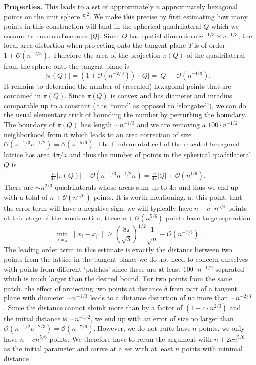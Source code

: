 \documentclass[10pt, reqno]{amsart}
\begin{document}
\textbf{Properties.} This leads to a set of approximately $n$ approximately hexagonal points on the unit sphere $\mathbb{S}^2$.  We make this precise by first estimating how many points in this construction will land in the spherical quadrilateral $Q$ which we assume to have surface area $|Q|$. Since $Q$ has spatial dimensions $n^{-1/3} \times n^{-1/3}$, the local area distortion when projecting onto the tangent plane $T$ is of order $1 + \mathcal{O}(n^{-2/3})$. Therefore the area of the projection $\pi(Q)$ of the quadrilateral from the sphere onto the tangent plane is 
$$ |\pi(Q)| = (1+ \mathcal{O}(n^{-2/3})) \cdot |Q| = |Q| + \mathcal{O}(n^{-4/3}).$$
It remains to determine the number of (rescaled) hexagonal points that are contained in $\pi(Q)$.  Since $\pi(Q)$ is convex and has diameter and inradius comparable up to a constant (it is `round' as opposed to `elongated'), we can do the usual elementary trick of bounding the number by perturbing the boundary. The boundary of $\pi(Q)$ has length $\sim n^{-1/3}$ and we are removing a $100\cdot n^{-1/2}$ neighborhood from it which leads to an area correction of size $\mathcal{O}(n^{-1/3} n^{-1/2}) = \mathcal{O}(n^{-5/6})$. 
The fundamental cell of the rescaled hexagonal lattice has area $4\pi/n$ and thus the number of points in the spherical quadrilateral $Q$ is
 \begin{align*}
 \frac{n}{4 \pi} |\pi(Q)| + \mathcal{O}(n^{-1/3} n^{-1/2} n) = \frac{n}{4\pi} |Q| + \mathcal{O}(n^{1/6}).
 \end{align*}
 There are $\sim n^{2/3}$ quadrilaterals whose areas sum up to $4\pi$ and thus we end up with a total of
 $n + \mathcal{O}(n^{5/6})$ points. It is worth mentioning, at this point, that the error term will have a negative sign: we will typically
 have $n - c \cdot n^{5/6}$ points at this stage of the construction; these  $n + \mathcal{O}(n^{5/6})$  points have large separation
 $$ \min_{i \neq j} \|x_i - x_j\| \geq   \left( \frac{8 \pi}{\sqrt{3}} \right)^{1/2} \frac{1}{\sqrt{n}} - \mathcal{O}(n^{-7/6}).$$
 The leading order term in this estimate is exactly the distance between two points from the lattice in the tangent plane; we do not need to concern ourselves with points from different `patches' since these are at least $100 \cdot n^{-1/2}$ separated which is much larger than the desired bound. For two points from the same patch, the effect of projecting two points at distance $\delta$ from part of a tangent plane with diameter $\sim n^{-1/3}$ leads to a distance distortion of no more than $\sim n^{-2/3}$. Since the distance cannot shrink more than by a factor of $(1- c \cdot n^{2/3})$ and the initial distance is $\sim n^{-1/2}$, we end up with an error of size no larger than $\mathcal{O}(n^{-1/2} n^{-2/3})= \mathcal{O}(n^{-7/6})$. However, we do not quite have $n$ points, we only have $n - c n^{5/6}$ points. We therefore have to rerun the argument with $n + 2 c n^{5/6}$ as the initial parameter and arrive at a set with at least $n$ points with minimal distance
\end{document}
